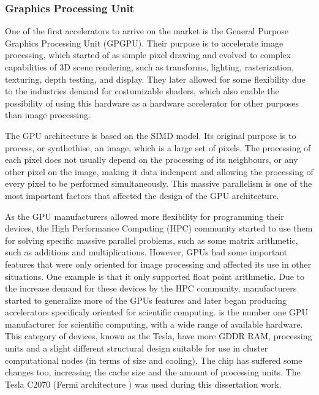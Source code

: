 \subsubsection*{Graphics Processing Unit}
\label{GPU}

One of the first accelerators to arrive on the market is the General Purpose Graphics Processing Unit (GPGPU). Their purpose is to accelerate image processing, which started of as simple pixel drawing and evolved to complex capabilities of 3D scene rendering, such as transforms, lighting, rasterization, texturing, depth testing, and display. They later allowed for some flexibility due to the industries demand for costumizable shaders, which also enable the possibility of using this hardware as a hardware accelerator for other purposes than image processing.

The GPU architecture is based on the SIMD model. Its original purpose is to process, or synthethise, an image, which is a large set of pixels. The processing of each pixel does not usually depend on the processing of its neighbours, or any other pixel on the image, making it data indenpent and allowing the processing of every pixel to be performed simultaneously. This massive parallelism is one of the most important factors that affected the design of the GPU architecture.

As the GPU manufacturers allowed more flexibility for programming their devices, the High Performance Computing (HPC) community started to use them for solving specific massive parallel problems, such as some matrix arithmetic, such as additions and multiplications. However, GPUs had some important features that were only oriented for image processing and affected its use in other situations. One example is that it only supported float point arithmetic. Due to the increase demand for these devices by the HPC community, manufacturers started to generalize more of the GPUs features and later began producing accelerators specificaly oriented for scientific computing. \nvidia is the number one GPU manufacturer for scientific computing, with a wide range of available hardware. This category of devices, known as the Tesla, have more GDDR RAM, processing units and a slight different structural design suitable for use in cluster computational nodes (in terms of size and cooling). The chip has suffered some changes too, increasing the cache size and the amount of processing units. The \nvidia Tesla C2070 (Fermi architecture \cite{NVIDIA:Fermi}) was used during this dissertation work.

